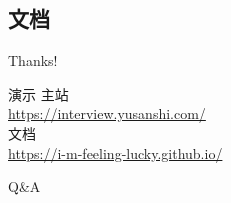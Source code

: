 \documentclass[aspectratio=169,10pt]{beamer}
\begin{document}
\subsection{文档}
{
  \begin{frame}[plain]
  \end{frame}
}

\begin{frame}[standout]
  \huge Thanks!
\end{frame}

\appendix

\begin{frame}{演示}
  \large
  主站\\
  \url{https://interview.yusanshi.com/} \\
  \bigskip
  文档\\
  \url{https://i-m-feeling-lucky.github.io/}
\end{frame}

\begin{frame}[standout]
  \huge Q\&A
\end{frame}
\end{document}

